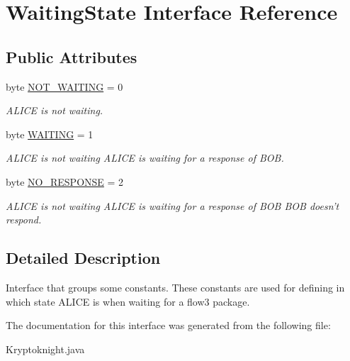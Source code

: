 \hypertarget{interface_waiting_state}{
\section{Waiting\-State Interface Reference}
\label{interface_waiting_state}
}
\subsection*{Public Attributes}
\begin{CompactItemize}
\item 
\hypertarget{interface_waiting_state_o0}{
byte \hyperlink{interface_waiting_state_o0}{NOT\_\-WAITING} = 0}
\label{interface_waiting_state_o0}

\begin{CompactList}\small\item\em ALICE is not waiting. \item\end{CompactList}\item 
\hypertarget{interface_waiting_state_o1}{
byte \hyperlink{interface_waiting_state_o1}{WAITING} = 1}
\label{interface_waiting_state_o1}

\begin{CompactList}\small\item\em ALICE is not waiting ALICE is waiting for a response of BOB. \item\end{CompactList}\item 
\hypertarget{interface_waiting_state_o2}{
byte \hyperlink{interface_waiting_state_o2}{NO\_\-RESPONSE} = 2}
\label{interface_waiting_state_o2}

\begin{CompactList}\small\item\em ALICE is not waiting ALICE is waiting for a response of BOB BOB doesn't respond. \item\end{CompactList}\end{CompactItemize}


\subsection{Detailed Description}
Interface that groups some constants. These constants are used for defining in which state ALICE is when waiting for a flow3 package. 



The documentation for this interface was generated from the following file:\begin{CompactItemize}
\item 
Kryptoknight.java\end{CompactItemize}
